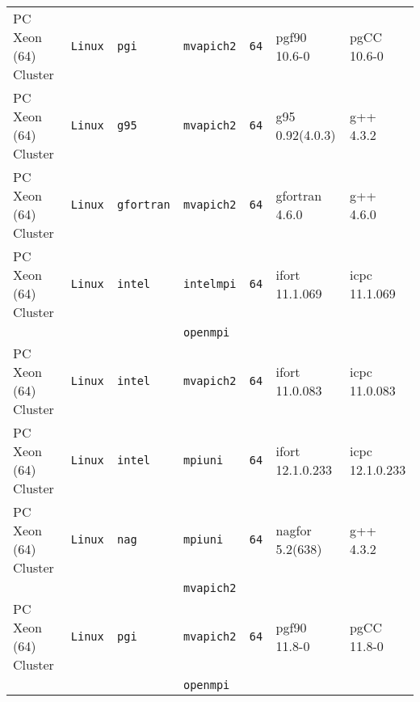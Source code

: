 \begin{tabular}{lllllll}
PC Xeon (64) Cluster  &\tt Linux  &\tt pgi          &\tt mvapich2   &\tt 64              & pgf90 \footnotesize 10.6-0         & pgCC \footnotesize 10.6-0       \\ %
PC Xeon (64) Cluster  &\tt Linux  &\tt g95          &\tt mvapich2   &\tt 64              & g95 \footnotesize 0.92(4.0.3)      & g++ \footnotesize 4.3.2         \\ %
PC Xeon (64) Cluster  &\tt Linux  &\tt gfortran     &\tt mvapich2   &\tt 64              & gfortran \footnotesize 4.6.0       & g++ \footnotesize 4.6.0         \\ %
PC Xeon (64) Cluster  &\tt Linux  &\tt intel        &\tt intelmpi   &\tt 64              & ifort \footnotesize 11.1.069       & icpc \footnotesize 11.1.069     \\ %
                      &           &                 &\tt openmpi    &                    &                                    &                                 \\
PC Xeon (64) Cluster  &\tt Linux  &\tt intel        &\tt mvapich2   &\tt 64              & ifort \footnotesize 11.0.083       & icpc \footnotesize 11.0.083     \\ %
PC Xeon (64) Cluster  &\tt Linux  &\tt intel        &\tt mpiuni     &\tt 64              & ifort \footnotesize 12.1.0.233     & icpc \footnotesize 12.1.0.233   \\ %
PC Xeon (64) Cluster  &\tt Linux  &\tt nag          &\tt mpiuni     &\tt 64              & nagfor \footnotesize 5.2(638)      & g++  \footnotesize 4.3.2        \\ %
                      &           &                 &\tt mvapich2   &                    &                                    &                                 \\
PC Xeon (64) Cluster  &\tt Linux  &\tt pgi          &\tt mvapich2   &\tt 64              & pgf90 \footnotesize 11.8-0         & pgCC \footnotesize 11.8-0       \\ %
                      &           &                 &\tt openmpi    &                    &                                    &                                 \\

\end{tabular}
